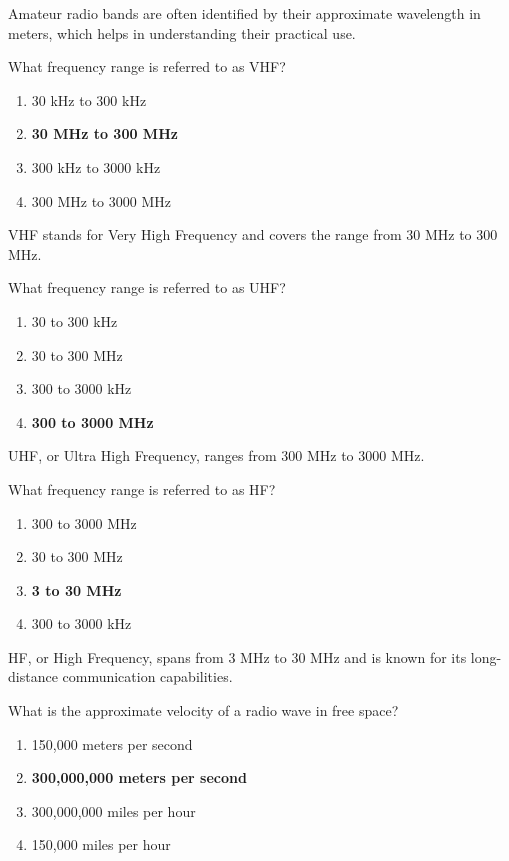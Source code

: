 Amateur radio bands are often identified by their approximate wavelength in meters, which helps in understanding their practical use.

\begin{tcolorbox}[colback=gray!10!white,colframe=black!75!black,title={T3B08}]
What frequency range is referred to as VHF?
\begin{enumerate}[label=\Alph*),noitemsep]
    \item 30 kHz to 300 kHz
    \item \textbf{30 MHz to 300 MHz}
    \item 300 kHz to 3000 kHz
    \item 300 MHz to 3000 MHz
\end{enumerate}
\end{tcolorbox}

VHF stands for Very High Frequency and covers the range from 30 MHz to 300 MHz.

\begin{tcolorbox}[colback=gray!10!white,colframe=black!75!black,title={T3B09}]
What frequency range is referred to as UHF?
\begin{enumerate}[label=\Alph*),noitemsep]
    \item 30 to 300 kHz
    \item 30 to 300 MHz
    \item 300 to 3000 kHz
    \item \textbf{300 to 3000 MHz}
\end{enumerate}
\end{tcolorbox}

UHF, or Ultra High Frequency, ranges from 300 MHz to 3000 MHz.

\begin{tcolorbox}[colback=gray!10!white,colframe=black!75!black,title={T3B10}]
What frequency range is referred to as HF?
\begin{enumerate}[label=\Alph*),noitemsep]
    \item 300 to 3000 MHz
    \item 30 to 300 MHz
    \item \textbf{3 to 30 MHz}
    \item 300 to 3000 kHz
\end{enumerate}
\end{tcolorbox}

HF, or High Frequency, spans from 3 MHz to 30 MHz and is known for its long-distance communication capabilities.

\begin{tcolorbox}[colback=gray!10!white,colframe=black!75!black,title={T3B11}]
What is the approximate velocity of a radio wave in free space?
\begin{enumerate}[label=\Alph*),noitemsep]
    \item 150,000 meters per second
    \item \textbf{300,000,000 meters per second}
    \item 300,000,000 miles per hour
    \item 150,000 miles per hour
\end{enumerate}
\end{tcolorbox}

